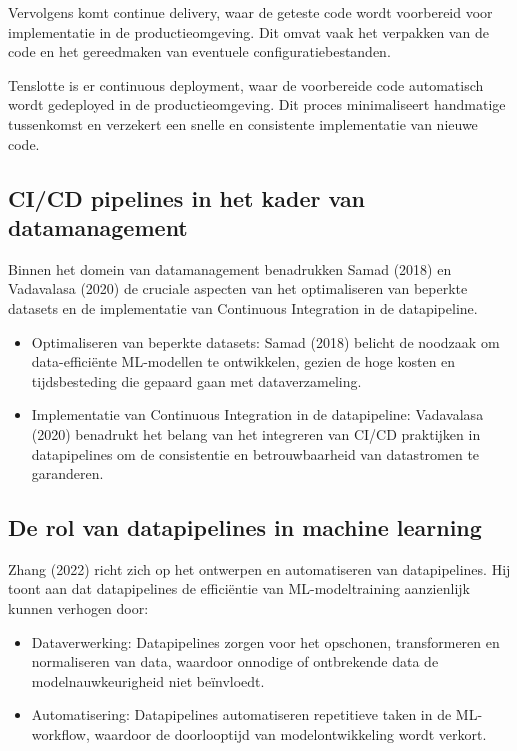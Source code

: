 Vervolgens komt continue delivery, waar de geteste code wordt voorbereid voor implementatie in de productieomgeving. Dit omvat vaak het verpakken van de code en het gereedmaken van eventuele configuratiebestanden.

Tenslotte is er continuous deployment, waar de voorbereide code automatisch wordt gedeployed in de productieomgeving. Dit proces minimaliseert handmatige tussenkomst en verzekert een snelle en consistente implementatie van nieuwe code.

\subsection{CI/CD pipelines in het kader van datamanagement}

Binnen het domein van datamanagement benadrukken Samad (2018) en Vadavalasa (2020) de cruciale aspecten van het optimaliseren van beperkte datasets en de implementatie van Continuous Integration in de datapipeline.

\begin{itemize}
    \item Optimaliseren van beperkte datasets: Samad (2018) belicht de noodzaak om data-efficiënte ML-modellen te ontwikkelen, gezien de hoge kosten en tijdsbesteding die gepaard gaan met dataverzameling.
    \item Implementatie van Continuous Integration in de datapipeline: Vadavalasa (2020) benadrukt het belang van het integreren van CI/CD praktijken in datapipelines om de consistentie en betrouwbaarheid van datastromen te garanderen.
\end{itemize}

\subsection{De rol van datapipelines in machine learning}

Zhang (2022) richt zich op het ontwerpen en automatiseren van datapipelines. Hij toont aan dat datapipelines de efficiëntie van ML-modeltraining aanzienlijk kunnen verhogen door:

\begin{itemize}
    \item Dataverwerking: Datapipelines zorgen voor het opschonen, transformeren en normaliseren van data, waardoor onnodige of ontbrekende data de modelnauwkeurigheid niet beïnvloedt.
    \item Automatisering: Datapipelines automatiseren repetitieve taken in de ML-workflow, waardoor de doorlooptijd van modelontwikkeling wordt verkort.
\end{itemize}


